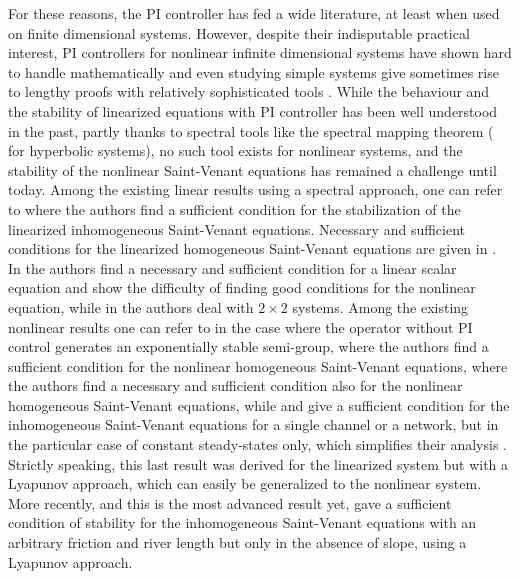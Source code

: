 \documentclass[JEP,XML,SOM,Unicode]{cedram}
\theoremstyle{definition}
\begin{document}
For these reasons, the PI controller has fed a wide literature, at least when used on finite dimensional systems.
However, despite their indisputable practical interest, PI controllers for nonlinear infinite dimensional systems have shown hard to handle mathematically
and even studying simple systems give sometimes rise to lengthy proofs with relatively sophisticated tools \cite{PItransport}.
While the behaviour and the stability of linearized equations
with PI controller
has been well understood in the past, partly thanks to spectral tools like the spectral mapping theorem (\eg \cite{Neves,Lichtner} for hyperbolic systems), no such {tool exists} for nonlinear systems, and
the stability of the nonlinear Saint-Venant equations has remained a challenge until today.
{Among the existing linear results using a spectral approach, one can refer to \cite{XuSallet,XuSallet2014} where the authors find a sufficient condition for the stabilization of the linearized inhomogeneous Saint-Venant equations.
Necessary and sufficient conditions for the linearized homogeneous Saint-Venant equations
are given in \cite[\S\S 2.2.4.1,\,3.4.4]{BastinCoron1D}.
In \cite{CoronTamasoiu2015} the authors find a necessary and sufficient condition for a linear scalar equation and show the difficulty of finding good conditions for the nonlinear equation, while
in \cite{BastinCoronTamasoiu2015} the authors deal with $2\times2$ systems.}
Among the existing nonlinear results
{one can refer to {\cite{TerrandAndrieuDos} in the case where the operator without PI control generates an exponentially stable semi-group},
\cite{Trinh2015} where the authors find a sufficient condition for the nonlinear homogeneous Saint-Venant equations,
\cite[2.2.4.2]{BastinCoron1D} where the authors find a necessary and sufficient condition also for the
nonlinear homogeneous Saint-Venant equations,
while
\cite[\S\S 5.4.4,\,5.5]{BastinCoron1D} and \cite{BastinCoron2013} give a sufficient condition for the inhomogeneous Saint-Venant equations for a single channel or a network,
but in the particular case of constant steady-states only, which simplifies their analysis \cite{C1}. Strictly speaking, this last result was derived for the linearized system
but with a Lyapunov approach, which can easily be generalized to the nonlinear system.}
More recently, and this is the most advanced result yet, \cite{BastinCoronPI} gave a sufficient condition of stability for the inhomogeneous Saint-Venant equations with an arbitrary friction and river length but only
in the absence of slope, using a Lyapunov approach.
\end{document}
